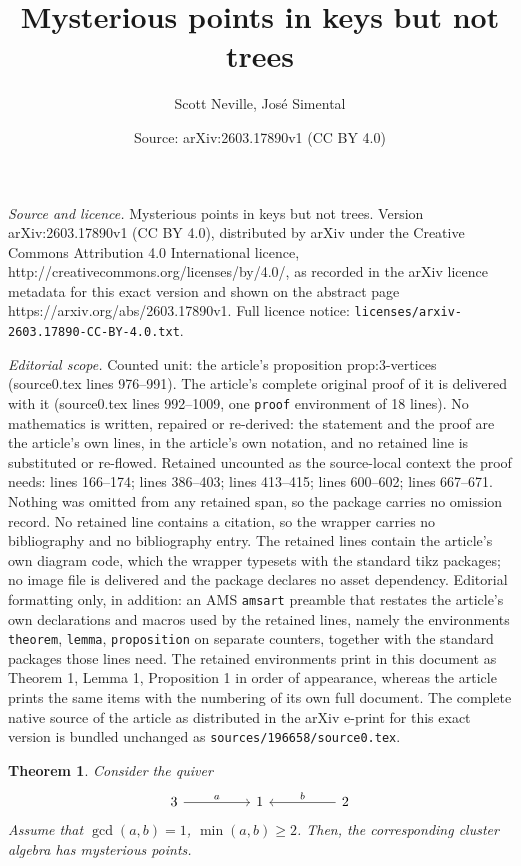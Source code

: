 \documentclass[10pt,a4paper]{amsart}
\title{Mysterious points in keys but not trees}
\author{Scott Neville, Jos\'e Simental}
\date{Source: arXiv:2603.17890v1 (CC BY 4.0)}
\newtheorem{theorem}{Theorem}
\begin{document}
\maketitle

\noindent\emph{Source and licence.} Mysterious points in keys but not trees. Version arXiv:2603.17890v1 (CC BY 4.0), distributed by arXiv under the Creative Commons Attribution 4.0 International licence, http://creativecommons.org/licenses/by/4.0/, as recorded in the arXiv licence metadata for this exact version and shown on the abstract page https://arxiv.org/abs/2603.17890v1. Full licence notice: \texttt{licenses/arxiv-2603.17890-CC-BY-4.0.txt}.\par\smallskip

\noindent\textit{Editorial scope.} Counted unit: the article's proposition prop:3-vertices (source0.tex lines 976--991). The article's complete original proof of it is delivered with it (source0.tex lines 992--1009, one \texttt{proof} environment of 18 lines). No mathematics is written, repaired or re-derived: the statement and the proof are the article's own lines, in the article's own notation, and no retained line is substituted or re-flowed.  Retained uncounted as the source-local context the proof needs: lines 166--174; lines 386--403; lines 413--415; lines 600--602; lines 667--671.  Nothing was omitted from any retained span, so the package carries no omission record.  No retained line contains a citation, so the wrapper carries no bibliography and no bibliography entry.  The retained lines contain the article's own diagram code, which the wrapper typesets with the standard tikz packages; no image file is delivered and the package declares no asset dependency.  Editorial formatting only, in addition: an AMS \texttt{amsart} preamble that restates the article's own declarations and macros used by the retained lines, namely the environments \texttt{theorem}, \texttt{lemma}, \texttt{proposition} on separate counters, together with the standard packages those lines need.  The retained environments print in this document as Theorem 1, Lemma 1, Proposition 1 in order of appearance, whereas the article prints the same items with the numbering of its own full document.  The complete native source of the article as distributed in the arXiv e-print for this exact version is bundled unchanged as \texttt{sources/196658/source0.tex}.
\begin{theorem}\label{thm:main2-intro}
Consider the quiver
\[\begin{tikzcd}
	3 && 1 && 2
	\arrow["a", from=1-1, to=1-3] %
	\arrow["b"', from=1-5, to=1-3] %
\end{tikzcd}\]
Assume that $\gcd(a,b)=1$, $\min(a,b) \geq 2$. Then, the corresponding cluster algebra has mysterious points. 
\end{theorem}
\end{document}
